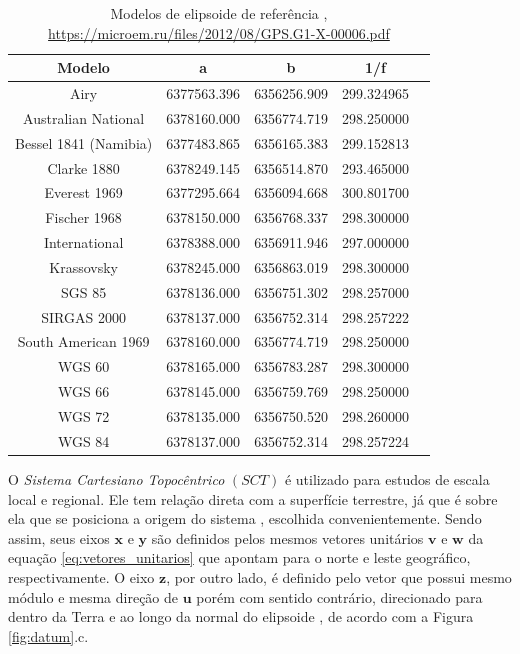 \begin{table}[]
	\caption {Modelos de elipsoide de referência \cite{li2001}, \url{https://microem.ru/files/2012/08/GPS.G1-X-00006.pdf}} \label{tab:ref_ellip} 
	\centering
	\begin{tabular}{c|c|c|c|c}
		Modelo & a & b & 1/f \\
		\hline
		Airy                  & 6377563.396 & 6356256.909 & 299.324965 \\ \hline 
		Australian National   & 6378160.000 & 6356774.719 & 298.250000 \\ \hline
		Bessel 1841 (Namibia) & 6377483.865 & 6356165.383 & 299.152813 \\ \hline
		Clarke 1880           & 6378249.145 & 6356514.870 & 293.465000 \\ \hline
		Everest 1969          & 6377295.664 & 6356094.668 & 300.801700 \\ \hline
		Fischer 1968          & 6378150.000 & 6356768.337 & 298.300000 \\ \hline
		International         & 6378388.000 & 6356911.946 & 297.000000 \\ \hline
		Krassovsky            & 6378245.000 & 6356863.019 & 298.300000 \\ \hline
		SGS 85                & 6378136.000 & 6356751.302 & 298.257000 \\ \hline
		SIRGAS 2000           & 6378137.000 & 6356752.314 & 298.257222 \\ \hline
		South American 1969   & 6378160.000 & 6356774.719 & 298.250000 \\ \hline
		WGS 60                & 6378165.000 & 6356783.287 & 298.300000 \\ \hline
		WGS 66                & 6378145.000 & 6356759.769 & 298.250000 \\ \hline
		WGS 72                & 6378135.000 & 6356750.520 & 298.260000 \\ \hline
		WGS 84                & 6378137.000 & 6356752.314 & 298.257224 \\ \hline
	\end{tabular}
\end{table}

O \textit{Sistema Cartesiano Topocêntrico} $(SCT)$ é utilizado para estudos de escala local e regional. Ele tem relação direta com a superfície terrestre, já que é sobre ela que se posiciona a origem do sistema \cite{cai2011}, escolhida convenientemente. Sendo assim,  seus eixos $\mathbf{x}$ e $\mathbf{y}$ são definidos pelos mesmos vetores unitários $\mathbf{v}$ e $ \textbf{w}$ da equação \ref{eq:vetores_unitarios} que apontam para o norte e leste geográfico, respectivamente. O eixo $\mathbf{z}$, por outro lado, é definido pelo vetor que possui mesmo módulo e mesma direção de $\textbf{u}$ porém com sentido contrário, direcionado para dentro da Terra e ao longo da normal do elipsoide \cite{cai2011}, de acordo com a Figura \ref{fig:datum}.c.

